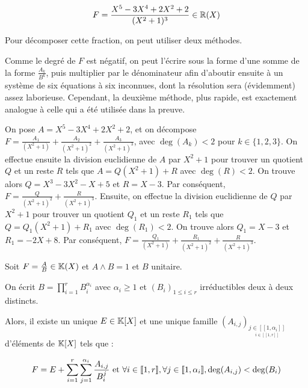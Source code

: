 \documentclass[12pt, a4paper]{report}
\begin{document}
\begin{example}
    $$F = \frac{X^5-3X^4+2X^2+2}{(X^2+1)^3} \in \mathbb{R}(X)$$

    Pour décomposer cette fraction, on peut utiliser deux méthodes.
    \begin{outline}
        \1 Comme le degré de $F$ est négatif, on peut l'écrire sous la forme d'une somme de la forme $\frac{A_k}{B^k}$, puis multiplier par le dénominateur afin d'aboutir ensuite à un système de six équations à six inconnues, dont la résolution sera (évidemment) assez laborieuse.
        \1 Cependant, la deuxième méthode, plus rapide, est exactement analogue à celle qui a été utilisée dans la preuve.
        
        \2 On pose $A= X^5-3X^4+2X^2+2$, et on décompose $F = \frac{A_1}{(X^2+1)} + \frac{A_2}{(X^2+1)^2} + \frac{A_3}{(X^2+1)^3}$, avec $\deg(A_k) < 2$ pour $k \in \{1,2,3\}$.
        \2 On effectue ensuite la division euclidienne de $A$ par $X^2 + 1$ pour trouver un quotient $Q$ et un reste $R$ tels que $A = Q(X^2 + 1) + R$ avec $\deg(R) < 2$.
        \2 On trouve alors $Q = X^3 - 3X^2 - X + 5$ et $R=X-3$.
        \2 Par conséquent, $F = \frac{Q}{(X^2+1)^2} + \frac{R}{(X^2+1)^3}$.
        \2 Ensuite, on effectue la division euclidienne de $Q$ par $X^2 + 1$ pour trouver un quotient $Q_1$ et un reste $R_1$ tels que $Q = Q_1(X^2 + 1) + R_1$ avec $\deg(R_1) < 2$.
        \2 On trouve alors $Q_1 = X - 3$ et $R_1 = -2X + 8$.
        \2 Par conséquent, $F = \frac{Q_1}{(X^2+1)} + \frac{R_1}{(X^2+1)^2} + \frac{R}{(X^2+1)^3}$.
    \end{outline}
    
\end{example}

\begin{theorem}
    Soit $F = \frac AB \in \mathbb{K}(X)$ et $A\wedge B = 1$ et $B$ unitaire.

    On écrit $B = \prod_{i=1}^r B_i^{\alpha_i}$ avec $\alpha_i \ge 1$ et $(B_i)_{1\le i \le r}$ irréductibles deux à deux distincts.
    
    Alors, il existe un unique $E \in \mathbb{K}[X]$ et une unique famille $(A_{i,j})_{\underset{i \in [\![1,r]\!]}{j \in [\![1,\alpha_i]\!]}}$ d'éléments de $\mathbb{K}[X]$ tels que :

    $$F = E + \sum_{i=1}^r \sum_{j=1}^{\alpha_i} \frac{A_{i,j}}{B_i^j} \text{ et } \forall i \in [\![1,r]\!], \forall j \in [\![1,\alpha_i]\!], \deg(A_{i,j}) < \deg(B_i)$$
\end{theorem}
\end{document}

